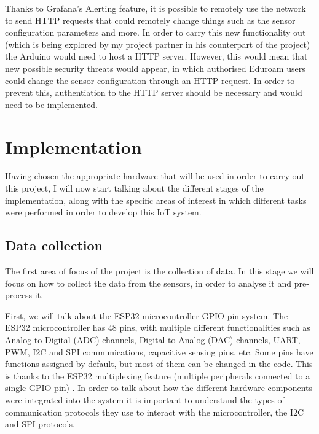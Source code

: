 \documentclass[12pt]{article}
\begin{document}
Thanks to Grafana's Alerting feature, it is possible to remotely use the network to send HTTP requests that could remotely change things such as the sensor configuration parameters and more. In order to carry this new functionality out (which is being explored by my project partner in his counterpart of the project) the Arduino would need to host a HTTP server. However, this would mean that new possible security threats would appear, in which authorised Eduroam users could change the sensor configuration through an HTTP request. In order to prevent this, authentiation to the HTTP server should be necessary and would need to be implemented.

\section{Implementation}

Having chosen the appropriate hardware that will be used in order to carry out this project, I will now start talking about the different stages of the implementation, along with the specific areas of interest in which different tasks were performed in order to develop this IoT system. 

\subsection{Data collection}

The first area of focus of the project is the collection of data. In this stage we will focus on how to collect the data from the sensors, in order to analyse it and pre-process it.\par

First, we will talk about the ESP32 microcontroller GPIO pin system. The ESP32 microcontroller has 48 pins, with multiple different functionalities such as Analog to Digital (ADC) channels, Digital to Analog (DAC) channels, UART, PWM, I2C and SPI communications, capacitive sensing pins, etc. Some pins have functions assigned by default, but most of them can be changed in the code. This is thanks to the ESP32 multiplexing feature (multiple peripherals connected to a single GPIO pin) \cite{randomnerd:gpio}. In order to talk about how the different hardware components were integrated into the system it is important to understand the types of communication protocols they use to interact with the microcontroller, the I2C and SPI protocols.
\end{document}
